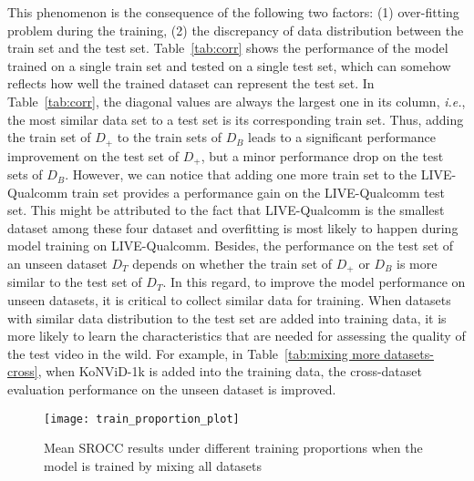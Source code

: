 \documentclass[twocolumn]{svjour3}          \smartqed  \usepackage{graphicx}
\begin{document}
This phenomenon is the consequence of the following two factors: (1) over-fitting problem during the training, (2) the discrepancy of data distribution between the train set and the test set.
Table~\ref{tab:corr} shows the performance of the model trained on a single train set and tested on a single test set, which can somehow reflects how well the trained dataset can represent the test set.
In Table~\ref{tab:corr}, the diagonal values are always the largest one in its column, \textit{i.e.}, the most similar data set to a test set is its corresponding train set.
Thus, adding the train set of $D_{+}$ to the train sets of $D_B$ leads to a significant performance improvement on the test set of $D_{+}$, but a minor performance drop on the test sets of $D_B$.
However, we can notice that adding one more train set to the LIVE-Qualcomm train set provides a performance gain on the LIVE-Qualcomm test set.
This might be attributed to the fact that LIVE-Qualcomm is the smallest dataset among these four dataset and overfitting is most likely to happen during model training on LIVE-Qualcomm.
Besides, the performance on the test set of an unseen dataset $D_T$ depends on whether the train set of $D_{+}$ or $D_B$ is more similar to the test set of $D_T$.
In this regard, to improve the model performance on unseen datasets, it is critical to collect similar data for training.
When datasets with similar data distribution to the test set are added into training data, it is more likely to learn the characteristics that are needed for assessing the quality of the test video in the wild. 
For example, in Table~\ref{tab:mixing more datasets-cross}, when KoNViD-1k is added into the training data, the cross-dataset evaluation performance on the unseen dataset is improved.





\begin{figure}[!htb]
    \centering
    \texttt{[image: train\_proportion\_plot]}
    \caption{Mean SROCC results under different training proportions when the model is trained by mixing all datasets}
    \label{fig:train proportion}
\end{figure}
\end{document}
